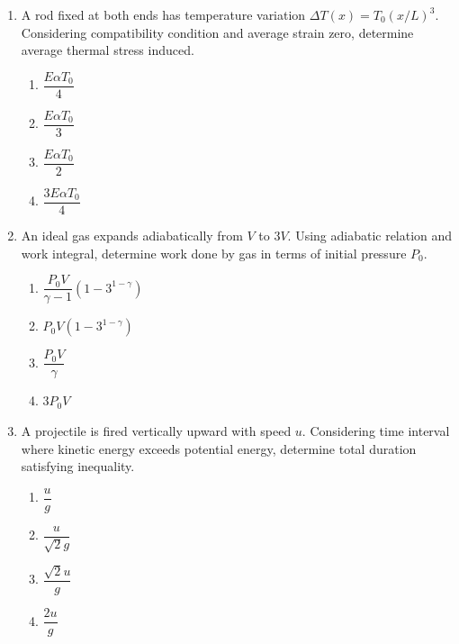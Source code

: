 \documentclass[12pt]{article}
\begin{document}
\begin{enumerate}
\begin{enumerate}
\item $-\dfrac{\Delta R}{2R}$
\item $-\dfrac{\Delta R}{R}$
\item $\dfrac{\Delta R}{2R}$
\item $\dfrac{\Delta R}{R}$
\end{enumerate}

\item
A rod fixed at both ends has temperature variation $\Delta T(x)=T_0(x/L)^3$. Considering compatibility condition and average strain zero, determine average thermal stress induced.

\begin{enumerate}
\item $\dfrac{E\alpha T_0}{4}$
\item $\dfrac{E\alpha T_0}{3}$
\item $\dfrac{E\alpha T_0}{2}$
\item $\dfrac{3E\alpha T_0}{4}$
\end{enumerate}

\item
An ideal gas expands adiabatically from $V$ to $3V$. Using adiabatic relation and work integral, determine work done by gas in terms of initial pressure $P_0$.

\begin{enumerate}
\item $\dfrac{P_0V}{\gamma-1}(1-3^{1-\gamma})$
\item $P_0V(1-3^{1-\gamma})$
\item $\dfrac{P_0V}{\gamma}$
\item $3P_0V$
\end{enumerate}

\item
A projectile is fired vertically upward with speed $u$. Considering time interval where kinetic energy exceeds potential energy, determine total duration satisfying inequality.

\begin{enumerate}
\item $\dfrac{u}{g}$
\item $\dfrac{u}{\sqrt{2}g}$
\item $\dfrac{\sqrt{2}u}{g}$
\item $\dfrac{2u}{g}$
\end{enumerate}


\end{enumerate}
\end{document}
